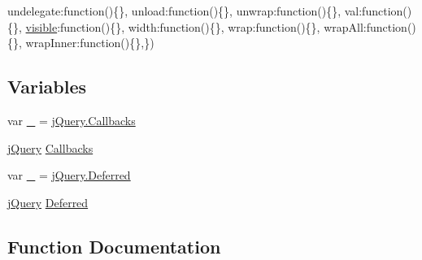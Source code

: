 \begin{DoxyCompactItemize}
\textquotesingle{}undelegate\textquotesingle{}\+:function()\{\}, \textquotesingle{}unload\textquotesingle{}\+:function()\{\}, \textquotesingle{}unwrap\textquotesingle{}\+:function()\{\}, \textquotesingle{}val\textquotesingle{}\+:function()\{\}, \textquotesingle{}\hyperlink{_scripts_2jquery-1_810_82_8min_8js_a52992524aa1f4d01d5c9f1b9a15c35f5}{visible}\textquotesingle{}\+:function()\{\}, \textquotesingle{}width\textquotesingle{}\+:function()\{\}, \textquotesingle{}wrap\textquotesingle{}\+:function()\{\}, \textquotesingle{}wrap\+All\textquotesingle{}\+:function()\{\}, \textquotesingle{}wrap\+Inner\textquotesingle{}\+:function()\{\},\})
\end{DoxyCompactItemize}
\subsection*{Variables}
\begin{DoxyCompactItemize}
\item 
var \hyperlink{jquery-1_810_82_8intellisense_8js_af58a9af35e2376001e3219aef7e0bda3}{\+\_} = \hyperlink{jquery-1_810_82_8intellisense_8js_add8d59d25831bb9b171fdbee8a18795b}{j\+Query.\+Callbacks}
\item 
\hyperlink{_scripts_2jquery-1_810_82_8js_a41c2e1bff4a6b292938143764e31d789}{j\+Query} \hyperlink{jquery-1_810_82_8intellisense_8js_add8d59d25831bb9b171fdbee8a18795b}{Callbacks}
\item 
var \hyperlink{jquery-1_810_82_8intellisense_8js_a2378dbe13bea17e176a553e3f262f342}{\+\_} = \hyperlink{jquery-1_810_82_8intellisense_8js_ab355ffd82371d88c17da7c1dae9e8829}{j\+Query.\+Deferred}
\item 
\hyperlink{_scripts_2jquery-1_810_82_8js_a41c2e1bff4a6b292938143764e31d789}{j\+Query} \hyperlink{jquery-1_810_82_8intellisense_8js_ab355ffd82371d88c17da7c1dae9e8829}{Deferred}
\end{DoxyCompactItemize}


\subsection{Function Documentation}
\hypertarget{jquery-1_810_82_8intellisense_8js_ad1527630d45bb696c9bc5e21e4bd7355}{}
